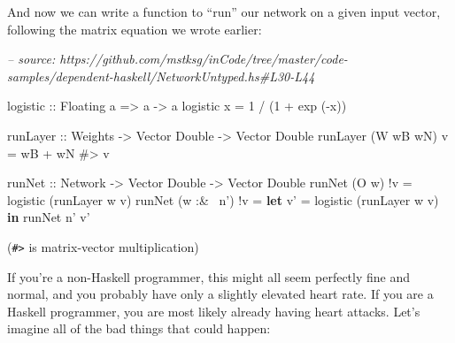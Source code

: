 \documentclass[]{article}
\newenvironment{Shaded}{}{}
\newcommand{\CommentTok}[1]{\textcolor[rgb]{0.38,0.63,0.69}{\textit{#1}}}
\newcommand{\DataTypeTok}[1]{\textcolor[rgb]{0.56,0.13,0.00}{#1}}
\newcommand{\DecValTok}[1]{\textcolor[rgb]{0.25,0.63,0.44}{#1}}
\newcommand{\FunctionTok}[1]{\textcolor[rgb]{0.02,0.16,0.49}{#1}}
\newcommand{\KeywordTok}[1]{\textcolor[rgb]{0.00,0.44,0.13}{\textbf{#1}}}
\newcommand{\NormalTok}[1]{#1}
\newcommand{\OtherTok}[1]{\textcolor[rgb]{0.00,0.44,0.13}{#1}}
\begin{document}
And now we can write a function to ``run'' our network on a given input vector,
following the matrix equation we wrote earlier:

\begin{Shaded}
\begin{Highlighting}[]
\CommentTok{-- source: https://github.com/mstksg/inCode/tree/master/code-samples/dependent-haskell/NetworkUntyped.hs#L30-L44}

\OtherTok{logistic ::} \DataTypeTok{Floating}\NormalTok{ a }\OtherTok{=>}\NormalTok{ a }\OtherTok{->}\NormalTok{ a}
\NormalTok{logistic x }\FunctionTok{=} \DecValTok{1} \FunctionTok{/}\NormalTok{ (}\DecValTok{1} \FunctionTok{+}\NormalTok{ exp (}\FunctionTok{-}\NormalTok{x))}

\OtherTok{runLayer ::} \DataTypeTok{Weights} \OtherTok{->} \DataTypeTok{Vector} \DataTypeTok{Double} \OtherTok{->} \DataTypeTok{Vector} \DataTypeTok{Double}
\NormalTok{runLayer (}\DataTypeTok{W}\NormalTok{ wB wN) v }\FunctionTok{=}\NormalTok{ wB }\FunctionTok{+}\NormalTok{ wN }\FunctionTok{#>}\NormalTok{ v}

\OtherTok{runNet ::} \DataTypeTok{Network} \OtherTok{->} \DataTypeTok{Vector} \DataTypeTok{Double} \OtherTok{->} \DataTypeTok{Vector} \DataTypeTok{Double}
\NormalTok{runNet (}\DataTypeTok{O}\NormalTok{ w)      }\FunctionTok{!}\NormalTok{v }\FunctionTok{=}\NormalTok{ logistic (runLayer w v)}
\NormalTok{runNet (w }\FunctionTok{:&~}\NormalTok{ n') }\FunctionTok{!}\NormalTok{v }\FunctionTok{=} \KeywordTok{let}\NormalTok{ v' }\FunctionTok{=}\NormalTok{ logistic (runLayer w v)}
                       \KeywordTok{in}\NormalTok{  runNet n' v'}
\end{Highlighting}
\end{Shaded}

(\texttt{\#\textgreater{}} is matrix-vector multiplication)

If you're a non-Haskell programmer, this might all seem perfectly fine and
normal, and you probably have only a slightly elevated heart rate. If you are a
Haskell programmer, you are most likely already having heart attacks. Let's
imagine all of the bad things that could happen:
\end{document}
